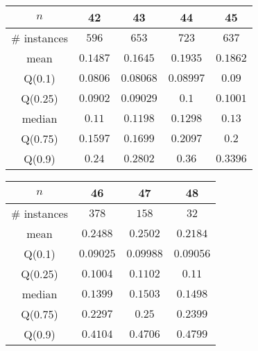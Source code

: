 \begin{tabular}{c|cccc} 
\hline 
$n$ & 42 & 43 & 44 & 45 \tabularnewline 
\hline 
\hline 
\# instances & $596$ & $653$ & $723$ & $637$ \tabularnewline 
mean & $0.1487$ & $0.1645$ & $0.1935$ & $0.1862$ \tabularnewline 
Q(0.1) & $0.0806$ & $0.08068$ & $0.08997$ & $0.09$ \tabularnewline 
Q(0.25) & $0.0902$ & $0.09029$ & $0.1$ & $0.1001$ \tabularnewline 
median & $0.11$ & $0.1198$ & $0.1298$ & $0.13$ \tabularnewline 
Q(0.75) & $0.1597$ & $0.1699$ & $0.2097$ & $0.2$ \tabularnewline 
Q(0.9) & $0.24$ & $0.2802$ & $0.36$ & $0.3396$ \tabularnewline 
\hline 
\end{tabular} 
\medskip{} 

\begin{tabular}{c|ccc} 
\hline 
$n$ & 46 & 47 & 48 \tabularnewline 
\hline 
\hline 
\# instances & $378$ & $158$ & $32$ \tabularnewline 
mean & $0.2488$ & $0.2502$ & $0.2184$ \tabularnewline 
Q(0.1) & $0.09025$ & $0.09988$ & $0.09056$ \tabularnewline 
Q(0.25) & $0.1004$ & $0.1102$ & $0.11$ \tabularnewline 
median & $0.1399$ & $0.1503$ & $0.1498$ \tabularnewline 
Q(0.75) & $0.2297$ & $0.25$ & $0.2399$ \tabularnewline 
Q(0.9) & $0.4104$ & $0.4706$ & $0.4799$ \tabularnewline 
\hline 
\end{tabular} 
\medskip{} 

